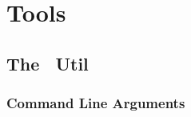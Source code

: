 
\chapter{Tools}

\section{The \ExBib\ Util}

\subsection{Command Line Arguments}


\INCOMPLETE


\endinput
%
the Style